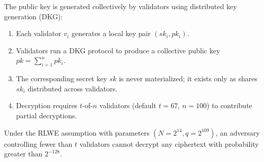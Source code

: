 The \FHE{} public key is generated collectively by \TChain{} validators using distributed key generation (DKG):

\begin{enumerate}
    \item Each validator $v_i$ generates a local key pair $(sk_i, pk_i)$.
    \item Validators run a DKG protocol to produce a collective public key $pk = \sum_{i=1}^{n} pk_i$.
    \item The corresponding secret key $sk$ is never materialized; it exists only as shares $sk_i$ distributed across validators.
    \item Decryption requires $t$-of-$n$ validators (default $t = 67$, $n = 100$) to contribute partial decryptions.
\end{enumerate}

\begin{theorem}
Under the \textsc{RLWE} assumption with parameters $(N = 2^{14}, q = 2^{109})$, an adversary controlling fewer than $t$ validators cannot decrypt any ciphertext with probability greater than $2^{-128}$.
\end{theorem}

